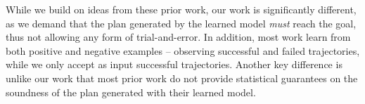 \documentclass{article}
\begin{document}
	
	While we build on ideas from these prior work, our work is significantly different, as we demand that  the plan generated by the learned model {\em must} reach the goal, thus not allowing any form of trial-and-error. 
	In addition, most work learn from both positive and negative examples -- observing successful and failed trajectories, while we only accept as input successful trajectories. 
	Another key difference is unlike our work that most prior work do not provide statistical guarantees on the soundness of the plan generated with their learned model. 
	
	
	
\end{document}
